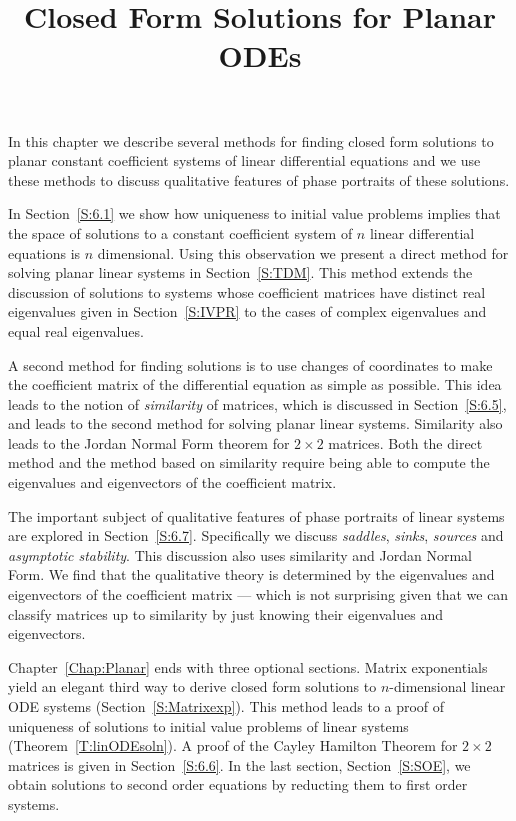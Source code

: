\documentclass{ximera}
\title{Closed Form Solutions for Planar ODEs}
\begin{document}
\begin{abstract}
\end{abstract}
\maketitle


\normalsize

In this chapter we describe several methods for finding closed form
solutions to planar constant coefficient systems of linear differential
equations and we use these methods to discuss qualitative features 
of phase portraits of these solutions.

In Section~\ref{S:6.1} we show how uniqueness to
initial value problems implies that the space of solutions to a constant
coefficient system of $n$ linear differential equations is $n$ dimensional.
Using this observation we present a direct method for solving planar linear
systems in Section~\ref{S:TDM}.  This method extends the discussion of
solutions to systems whose coefficient matrices have distinct real
eigenvalues given in Section~\ref{S:IVPR} to the cases of complex
eigenvalues and equal real eigenvalues.

A second method for finding solutions is to use changes of coordinates to 
make the coefficient matrix of the differential equation as simple as possible.  
This idea leads to the notion of {\em similarity\/} of matrices, which is discussed 
in Section~\ref{S:6.5}, and leads to the second method for solving planar linear 
systems. Similarity also leads to the Jordan Normal Form theorem for 
$2\times 2$ matrices.
Both the direct method and the method based on similarity require 
being able to compute the eigenvalues and eigenvectors of the coefficient matrix.

The important subject of qualitative features of phase portraits of linear systems are explored in
Section~\ref{S:6.7}.  Specifically we discuss {\em saddles\/}, {\em sinks\/}, 
{\em sources\/} and {\em asymptotic stability}.  This discussion also uses similarity 
and Jordan Normal Form.  We find that the qualitative theory is determined 
by the eigenvalues and eigenvectors of the coefficient matrix --- which is not 
surprising given that we can classify matrices up to similarity by just knowing 
their eigenvalues and eigenvectors.  

Chapter~\ref{Chap:Planar} ends with three optional sections.  Matrix exponentials 
yield an elegant third way to derive closed form solutions to $n$-dimensional linear 
ODE systems (Section~\ref{S:Matrixexp}).  This method 
leads to a proof of uniqueness of solutions to initial value problems of linear systems 
(Theorem~\ref{T:linODEsoln}).  A proof of the Cayley Hamilton Theorem 
for $2\times 2$ matrices is given in Section~\ref{S:6.6}.
In the last section, Section~\ref{S:SOE}, we obtain solutions to second order 
equations by reducting them to first order systems.
\end{document}
